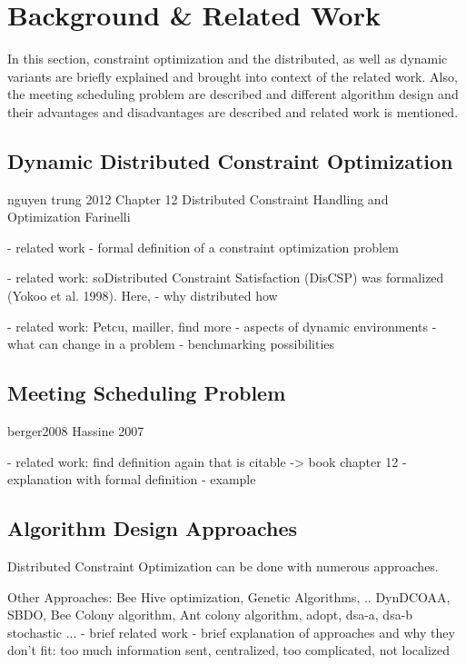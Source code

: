 \chapter{Background \& Related Work}

In this section, constraint optimization and the distributed, as well as dynamic variants are briefly explained and brought into context of the related work. Also, the meeting scheduling problem are described and different algorithm design and their advantages and disadvantages are described and related work is mentioned.
    
\section{Dynamic Distributed Constraint Optimization}

\cite{Chapman2011}
nguyen trung 2012
Chapter 12 Distributed Constraint Handling and Optimization Farinelli


    - related work
    - formal definition of a constraint optimization problem
    
    - related work: soDistributed Constraint Satisfaction (DisCSP) was formalized (Yokoo et al. 1998). Here,
    - why distributed how
    
    - related work: Petcu, mailler, find more
    - aspects of dynamic environments
    - what can change in a problem
    - benchmarking possibilities

\section{Meeting Scheduling Problem}  

    \cite{Angulo2007}
    \cite{Maheswaran} %
    berger2008
    Hassine 2007
    

    - related work: find definition again that is citable -> book chapter 12
    - explanation with formal definition
    - example

\section{Algorithm Design Approaches}

    Distributed Constraint Optimization can be done with numerous approaches.

    Other Approaches: Bee Hive optimization, Genetic Algorithms, .. DynDCOAA, SBDO, Bee Colony algorithm, Ant colony algorithm, adopt, dsa-a, dsa-b stochastic ...
    - brief related work
    - brief explanation of approaches and why they don't fit: too much information sent, centralized, too complicated, not localized
    

